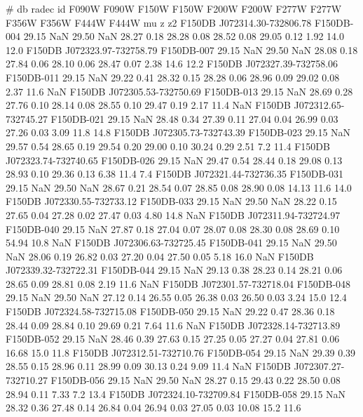 # db radec id F090W F090W F150W F150W F200W F200W F277W F277W F356W F356W F444W F444W mu z z2
F150DB J072314.30-732806.78   F150DB-004     29.15 NaN     29.50 NaN  28.27  0.18   28.28  0.08   28.52  0.08   29.05  0.12   1.92   14.0   12.0
F150DB J072323.97-732758.79   F150DB-007     29.15 NaN    29.50 NaN  28.08  0.18   27.84  0.06   28.10  0.06   28.47  0.07   2.38   14.6   12.2
F150DB J072327.39-732758.06   F150DB-011     29.15 NaN  29.22  0.41   28.32  0.15   28.28  0.06   28.96  0.09   29.02  0.08   2.37   11.6    NaN
F150DB J072305.53-732750.69   F150DB-013     29.15 NaN  28.69  0.28   27.76  0.10   28.14  0.08   28.55  0.10   29.47  0.19   2.17   11.4    NaN
F150DB J072312.65-732745.27   F150DB-021     29.15 NaN  28.48  0.34   27.39  0.11   27.04  0.04   26.99  0.03   27.26  0.03   3.09   11.8   14.8
F150DB J072305.73-732743.39   F150DB-023     29.15 NaN  29.57  0.54   28.65  0.19   29.54  0.20   29.00  0.10   30.24  0.29   2.51   7.2   11.4
F150DB J072323.74-732740.65   F150DB-026     29.15 NaN  29.47  0.54   28.44  0.18   29.08  0.13   28.93  0.10   29.36  0.13   6.38   11.4   7.4
F150DB J072321.44-732736.35   F150DB-031     29.15 NaN    29.50 NaN  28.67  0.21   28.54  0.07   28.85  0.08   28.90  0.08   14.13   11.6   14.0
F150DB J072330.55-732733.12   F150DB-033     29.15 NaN    29.50 NaN  28.22  0.15   27.65  0.04   27.28  0.02   27.47  0.03   4.80   14.8    NaN
F150DB J072311.94-732724.97   F150DB-040     29.15 NaN  27.87  0.18   27.04  0.07   28.07  0.08   28.30  0.08   28.69  0.10   54.94   10.8    NaN
F150DB J072306.63-732725.45   F150DB-041     29.15 NaN    29.50  NaN 28.06  0.19   26.82  0.03   27.20  0.04   27.50  0.05   5.18   16.0    NaN
F150DB J072339.32-732722.31   F150DB-044     29.15 NaN  29.13  0.38   28.23  0.14   28.21  0.06   28.65  0.09   28.81  0.08   2.19   11.6    NaN
F150DB J072301.57-732718.04   F150DB-048     29.15 NaN    29.50 NaN  27.12  0.14   26.55  0.05   26.38  0.03   26.50  0.03   3.24   15.0   12.4
F150DB J072324.58-732715.08   F150DB-050     29.15 NaN  29.22  0.47   28.36  0.18   28.44  0.09   28.84  0.10   29.69  0.21   7.64   11.6    NaN
F150DB J072328.14-732713.89   F150DB-052     29.15 NaN  28.46  0.39   27.63  0.15   27.25  0.05   27.27  0.04   27.81  0.06   16.68   15.0   11.8
F150DB J072312.51-732710.76   F150DB-054     29.15 NaN  29.39  0.39   28.55  0.15   28.96  0.11   28.99  0.09   30.13  0.24   9.09   11.4    NaN
F150DB J072307.27-732710.27   F150DB-056     29.15 NaN    29.50 NaN  28.27  0.15   29.43  0.22   28.50  0.08   28.94  0.11   7.33   7.2   13.4
F150DB J072324.10-732709.84   F150DB-058     29.15 NaN  28.32  0.36   27.48  0.14   26.84  0.04   26.94  0.03   27.05  0.03   10.08   15.2   11.6
